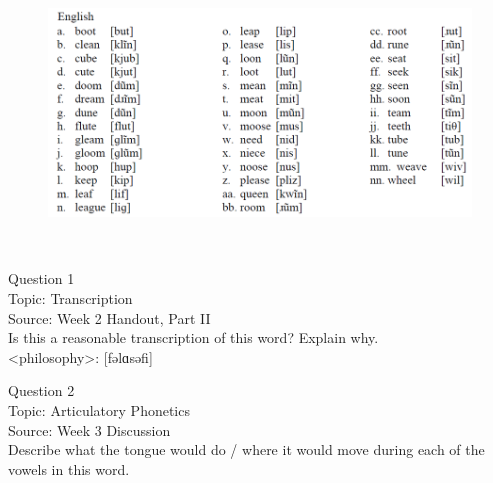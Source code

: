 \documentclass[12pt]{article}
\begin{document}
\begin{figure}[H]
\includegraphics{../images/english12.png}
\end{figure}

\newpage

\begin{center}
\textbf{{\color{red}{\HUGE END OF EXAM}}}\\

\end{center}
\newpage

\begin{center}
\textbf{{\color{blue}{\HUGE START OF EXAM\\}}}

\textbf{{\color{blue}{\HUGE Student ID: 55084\\}}}

\textbf{{\color{blue}{\HUGE \\}}}

\end{center}
\newpage

{\large Question 1}\\

Topic: Transcription\\
Source: Week 2 Handout, Part II\\

Is this a reasonable transcription of this word? Explain why.\\

<philosophy>: {[fəlɑsəfi]}


\newpage

{\large Question 2}\\

Topic: Articulatory Phonetics\\
Source: Week 3 Discussion\\

Describe what the tongue would do / where it would move during each of the vowels in this word.\\
\end{document}
